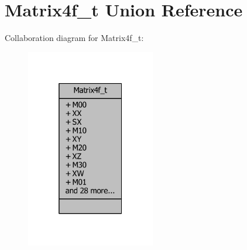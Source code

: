 \section{Matrix4f\-\_\-t Union Reference}
\label{unionMatrix4f__t}


Collaboration diagram for Matrix4f\-\_\-t\-:
\nopagebreak
\begin{figure}[H]
\begin{center}
\leavevmode
\includegraphics[width=160pt]{d7/db4/unionMatrix4f__t__coll__graph}
\end{center}
\end{figure}
